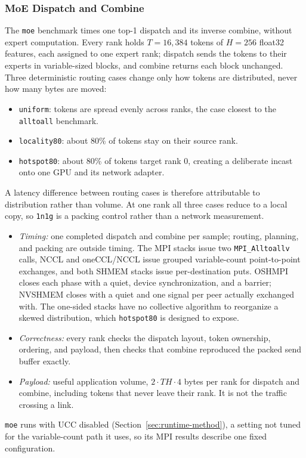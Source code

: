 \subsubsection{MoE Dispatch and Combine}\label{sec:moe-method}

The \texttt{moe} benchmark times one top-1 dispatch and its inverse combine, without expert computation. Every rank holds $T=16{,}384$ tokens of $H=256$ float32 features, each assigned to one expert rank; dispatch sends the tokens to their experts in variable-sized blocks, and combine returns each block unchanged. Three deterministic routing cases change only how tokens are distributed, never how many bytes are moved:
\begin{itemize}
    \item \texttt{uniform}: tokens are spread evenly across ranks, the case closest to the \texttt{alltoall} benchmark.
    \item \texttt{locality80}: about 80\% of tokens stay on their source rank.
    \item \texttt{hotspot80}: about 80\% of tokens target rank 0, creating a deliberate incast onto one GPU and its network adapter.
\end{itemize}
A latency difference between routing cases is therefore attributable to distribution rather than volume. At one rank all three cases reduce to a local copy, so \texttt{1n1g} is a packing control rather than a network measurement.
\begin{itemize}
    \item \emph{Timing:} one completed dispatch and combine per sample; routing, planning, and packing are outside timing. The MPI stacks issue two \texttt{MPI\_Alltoallv} calls, NCCL and oneCCL/NCCL issue grouped variable-count point-to-point exchanges, and both SHMEM stacks issue per-destination puts. OSHMPI closes each phase with a quiet, device synchronization, and a barrier; NVSHMEM closes with a quiet and one signal per peer actually exchanged with. The one-sided stacks have no collective algorithm to reorganize a skewed distribution, which \texttt{hotspot80} is designed to expose.
    \item \emph{Correctness:} every rank checks the dispatch layout, token ownership, ordering, and payload, then checks that combine reproduced the packed send buffer exactly.
    \item \emph{Payload:} useful application volume, $2 \cdot T H \cdot 4$ bytes per rank for dispatch and combine, including tokens that never leave their rank. It is not the traffic crossing a link.
\end{itemize}
\texttt{moe} runs with UCC disabled (Section~\ref{sec:runtime-method}), a setting not tuned for the variable-count path it uses, so its MPI results describe one fixed configuration.

